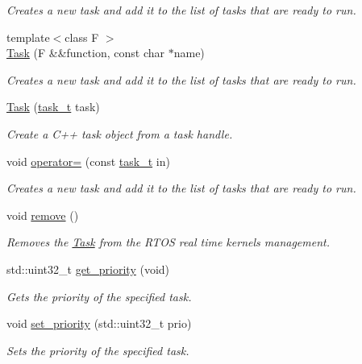 \begin{DoxyCompactItemize}
\begin{DoxyCompactList}\small\item\em Creates a new task and add it to the list of tasks that are ready to run. \end{DoxyCompactList}\item 
{\footnotesize template$<$class F $>$ }\\\hyperlink{classpros_1_1Task_ada7a776e565ab35ebe4737747cca9926}{Task} (F \&\&function, const char $\ast$name)
\begin{DoxyCompactList}\small\item\em Creates a new task and add it to the list of tasks that are ready to run. \end{DoxyCompactList}\item 
\hyperlink{classpros_1_1Task_a0b37b46942f1ba25513729b15a32e12f}{Task} (\hyperlink{rtos_8h_a1d7e0825b8d8876e8cd8ece3f9115293}{task\+\_\+t} task)
\begin{DoxyCompactList}\small\item\em Create a C++ task object from a task handle. \end{DoxyCompactList}\item 
void \hyperlink{classpros_1_1Task_aaaeae2788114241e149317248998781e}{operator=} (const \hyperlink{rtos_8h_a1d7e0825b8d8876e8cd8ece3f9115293}{task\+\_\+t} in)
\begin{DoxyCompactList}\small\item\em Creates a new task and add it to the list of tasks that are ready to run. \end{DoxyCompactList}\item 
void \hyperlink{classpros_1_1Task_a45269807dfc87bb1d5e9580346793e9d}{remove} ()
\begin{DoxyCompactList}\small\item\em Removes the \hyperlink{classpros_1_1Task}{Task} from the R\+T\+OS real time kernel\textquotesingle{}s management. \end{DoxyCompactList}\item 
std\+::uint32\+\_\+t \hyperlink{classpros_1_1Task_a97e11478bd99181a664ed6e975fdb248}{get\+\_\+priority} (void)
\begin{DoxyCompactList}\small\item\em Gets the priority of the specified task. \end{DoxyCompactList}\item 
void \hyperlink{classpros_1_1Task_a205a9937d34311ba10f540bc58d0b0b9}{set\+\_\+priority} (std\+::uint32\+\_\+t prio)
\begin{DoxyCompactList}\small\item\em Sets the priority of the specified task. \end{DoxyCompactList}\item 

\end{DoxyCompactItemize}
